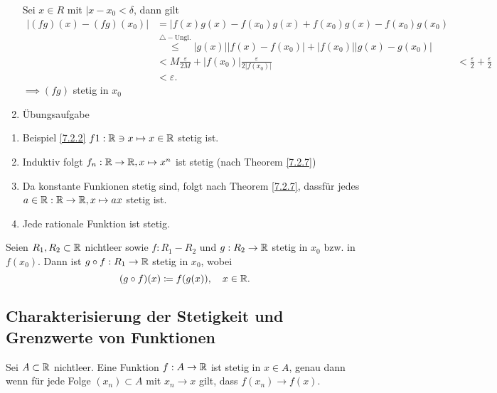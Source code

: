 \begin{subproof*}[Theorem 7.2.7.]
\begin{enumerate}[label=(\roman*)]
			Sei $ x \in R $ mit $ | x - x_0 < \delta $, dann gilt
			\begin{align*}
				| (fg)(x) - (fg)(x_0) | &= | f(x)g(x) - f(x_0)g(x) + f(x_0)g(x) - f(x_0)g(x_0) \\
							&\overset{\triangle-\text{Ungl.} }{\leq } |g(x)| | f(x) - f(x_0)| + |f(x_0)||g(x) - g(x_0)| \\
							&< M \frac{ \varepsilon  }{ 2M } + |f(x_0) | \frac{ \varepsilon  }{ 2|f(x_0)| } 
							&< \frac{ \varepsilon  }{ 2 } + \frac{ \varepsilon  }{ 2 } \\
							&< \varepsilon .
			\end{align*}
			$ \implies (fg) $ stetig in $ x_0 $
		\item Übungsaufgabe
	\end{enumerate}
\end{subproof*}

\begin{subexample}
	\begin{enumerate}[label=\arabic*.]
		\item Beispiel \ref{7.2.2} $ f1 : \mathbb{R} \ni x \mapsto x \in \mathbb{R}  $ stetig ist.
		\item Induktiv folgt $ f_n : \mathbb{R} \to \mathbb{R} , x \mapsto x^n $ ist stetig
			(nach Theorem \ref{7.2.7})
		\item Da konstante Funkionen stetig sind, folgt nach Theorem \ref{7.2.7}, dassfür jedes $ a \in \mathbb{R} : \mathbb{R} \to \mathbb{R} , x \mapsto ax $ stetig ist.
		\item Jede rationale Funktion ist stetig.
	\end{enumerate}
	
\end{subexample}

\begin{subtheorem}[(Präsenzaufgabe)]
	Seien $ R_1, R_2 \subset \mathbb{R}  $ nichtleer sowie $ f: R_1 - R_2 $ und $ g:R_2\to \mathbb{R}  $ stetig in $ x_0 $ bzw. in $ f(x_0) $. Dann ist $ g \circ f : R_1 \to \mathbb{R}  $ stetig in $ x_0 $, wobei
	\[
		(g \circ f) (x) \coloneqq f(g(x)), \quad x \in \mathbb{R} .
	\]
	
\end{subtheorem}

\subsection{Charakterisierung der Stetigkeit und Grenzwerte von Funktionen}
\begin{subtheorem}
	Sei $  A \subset \mathbb{R}  $ nichtleer.
	Eine Funktion $ f: A \to  \mathbb{R}   $ ist stetig in $ x \in  A $, genau dann wenn für jede Folge $ (x_n) \subset A $ mit $ x_n \to x $ gilt, dass $ f(x_n) \to f(x) $.
\end{subtheorem}

